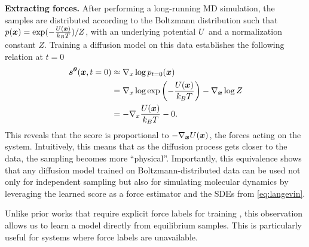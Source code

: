 \textbf{Extracting forces.} After performing a long-running \gls{MD} simulation, the samples are distributed according to the Boltzmann distribution \citep{boltzmann1868studien} such that $p({{\bm{x}}}) = \exp ( -\frac{U({{\bm{x}}})}{k_BT} ) / Z$, with an underlying potential $U$ and a normalization constant $Z$. Training a diffusion model on this data establishes the following relation at $t=0$
\begin{align} \label{eq:score-equals-forces}
    {{\bm{s}}^{\bm{\theta}}} ({{\bm{x}}}, {t}=0) & \approx \nabla_x \log p_{{t}=0} ({{\bm{x}}}) \\\nonumber
    & = \nabla_x \log \exp \left( -\frac{U ({{\bm{x}}})}{k_BT} \right) - \nabla_{{\bm{x}}} \log Z \\\nonumber
    & = - \nabla_x \frac{U ({{\bm{x}}})}{k_BT} - 0.
\end{align}
This reveals that the score is proportional to $-\nabla_{{\bm{x}}} U({{\bm{x}}})$, the forces acting on the system. Intuitively, this means that as the diffusion process gets closer to the data, the sampling becomes more \enquote{physical}.
Importantly, this equivalence shows that any diffusion model trained on Boltzmann-distributed data can be used not only for independent sampling but also for simulating molecular dynamics by leveraging the learned score as a force estimator and the \glspl{SDE} from \cref{eq:langevin}.

Unlike prior works that require explicit force labels for training \citep{husic2020coarse, durumeric2023machine, charron2023navigating,kramer2023statistically}, this observation allows us to learn a model directly from equilibrium samples.
This is particularly useful for systems where force labels are unavailable. 

